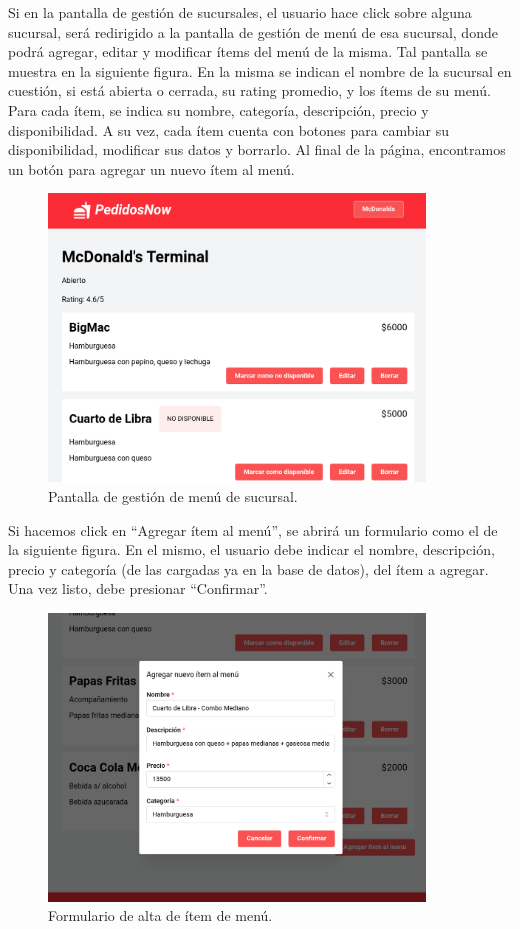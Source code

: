 Si en la pantalla de gestión de sucursales, el usuario hace click sobre alguna sucursal, será redirigido a la pantalla de gestión de menú de esa sucursal, donde podrá agregar, editar y modificar ítems del menú de la misma. Tal pantalla se muestra en la siguiente figura. En la misma se indican el nombre de la sucursal en cuestión, si está abierta o cerrada, su rating promedio, y los ítems de su menú. Para cada ítem, se indica su nombre, categoría, descripción, precio y disponibilidad. A su vez, cada ítem cuenta con botones para cambiar su disponibilidad, modificar sus datos y borrarlo. Al final de la página, encontramos un botón para agregar un nuevo ítem al menú.

\begin{figure}[H]
    \centering
    \includegraphics[width=10cm]{./img/items.png}
    \caption{Pantalla de gestión de menú de sucursal.}
\end{figure}

Si hacemos click en ``Agregar ítem al menú'', se abrirá un formulario como el de la siguiente figura. En el mismo, el usuario debe indicar el nombre, descripción, precio y categoría (de las cargadas ya en la base de datos), del ítem a agregar. Una vez listo, debe presionar ``Confirmar''.

\begin{figure}[H]
    \centering
    \includegraphics[width=10cm]{./img/item-add.png}
    \caption{Formulario de alta de ítem de menú.}
\end{figure}

